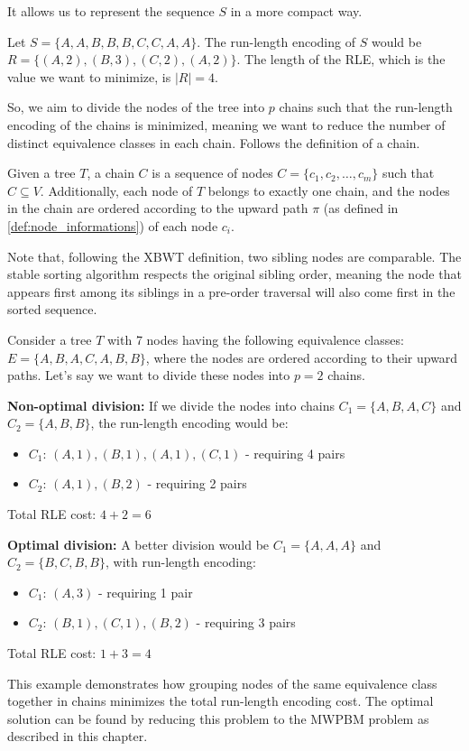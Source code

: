 It allows us to represent the sequence $S$ in a more compact way. 

\begin{example}
    Let $S = \{A, A, B, B, B, C, C, A, A\}$. The run-length encoding of $S$ would be $R = \{(A, 2), (B, 3), (C, 2), (A, 2)\}$. The length of the RLE, which is the value we want to minimize, is $|R|=4$.
\end{example}

So, we aim to divide the nodes of the tree into $p$ chains such that the run-length encoding of the chains is minimized, meaning we want to reduce the number of distinct equivalence classes in each chain. Follows the definition of a chain.

\begin{definition}[Chains] \label{def:chains}
    Given a tree $T$, a chain $C$ is a sequence of nodes $C = \{c_1, c_2, \dots, c_m\}$ such that $C\subseteq V$. Additionally, each node of $T$ belongs to exactly one chain, and the nodes in the chain are ordered according to the upward path $\pi$ (as defined in \cref{def:node_informations}) of each node $c_i$.
\end{definition}

Note that, following the XBWT definition, two sibling nodes are comparable. The stable sorting algorithm respects the original sibling order, meaning the node that appears first among its siblings in a pre-order traversal will also come first in the sorted sequence.

\begin{example}
    Consider a tree $T$ with 7 nodes having the following equivalence classes: $E = \{A, B, A, C, A, B, B\}$, where the nodes are ordered according to their upward paths. Let's say we want to divide these nodes into $p = 2$ chains.
    
    \textbf{Non-optimal division:} If we divide the nodes into chains $C_1 = \{A, B, A, C\}$ and $C_2 = \{A, B, B\}$, the run-length encoding would be:
    \begin{itemize}
        \item $C_1$: $(A,1), (B,1), (A,1), (C,1)$ - requiring 4 pairs
        \item $C_2$: $(A,1), (B,2)$ - requiring 2 pairs
    \end{itemize}
    Total RLE cost: $4 + 2 = 6$
    
    \textbf{Optimal division:} A better division would be $C_1 = \{A, A, A\}$ and $C_2 = \{B, C, B, B\}$, with run-length encoding:
    \begin{itemize}
        \item $C_1$: $(A,3)$ - requiring 1 pair
        \item $C_2$: $(B,1), (C,1), (B,2)$ - requiring 3 pairs
    \end{itemize}
    Total RLE cost: $1 + 3 = 4$
    
    This example demonstrates how grouping nodes of the same equivalence class together in chains minimizes the total run-length encoding cost. The optimal solution can be found by reducing this problem to the \textsc{MWPBM} problem as described in this chapter.
\end{example}

